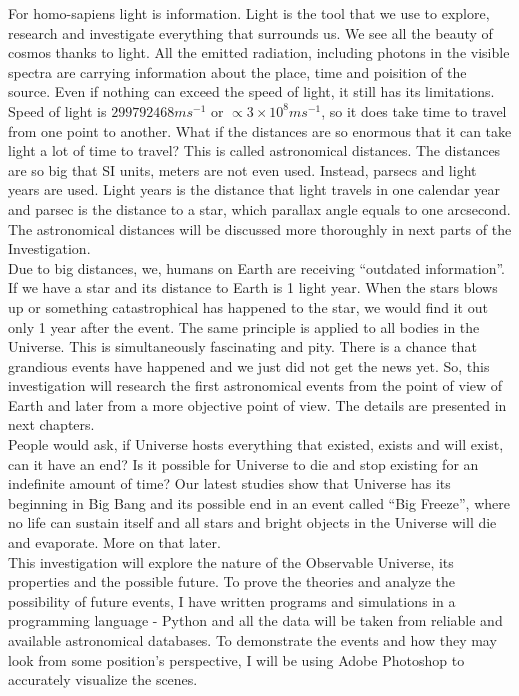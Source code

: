 \documentclass[a4paper]{IEEEtran}
\begin{document}
For homo-sapiens light is information. Light is the tool that we use to explore, research and investigate everything that surrounds us. We see all the beauty of cosmos thanks to light. All the emitted radiation, including photons in the visible spectra are carrying information about the place, time and poisition of the source. Even if nothing can exceed the speed of light, it still has its limitations. Speed of light is $299792468ms^{-1}$ or $\propto 3 \times 10^8ms^{-1}$\cite{speed}, so it does take time to travel from one point to another. What if the distances are so enormous that it can take light a lot of time to travel? This is called astronomical distances. The distances are so big that SI units, meters are not even used. Instead, parsecs and light years are used. Light years is the distance that light travels in one calendar year and parsec is the distance to a star, which parallax angle equals to one arcsecond. The astronomical distances will be discussed more thoroughly in next parts of the Investigation.\\

Due to big distances, we, humans on Earth are receiving ``outdated information''. If we have a star and its distance to Earth is 1 light year. When the stars blows up or something catastrophical has happened to the star, we would find it out only 1 year after the event. The same principle is applied to all bodies in the Universe. This is simultaneously fascinating and pity. There is a chance that grandious events have happened and we just did not get the news yet. So, this investigation will research the first astronomical events from the point of view of Earth and later from a more objective point of view. The details are presented in next chapters.\\

People would ask, if Universe hosts everything that existed, exists and will exist, can it have an end? Is it possible for Universe to die and stop existing for an indefinite amount of time? Our latest studies show that Universe has its beginning in Big Bang and its possible end in an event called ``Big Freeze'', where no life can sustain itself and all stars and bright objects in the Universe will die and evaporate. More on that later.\\

This investigation will explore the nature of the Observable Universe, its properties and the possible future. To prove the theories and analyze the possibility of future events, I have written programs and simulations in a programming language - Python and all the data will be taken from reliable and available astronomical databases. To demonstrate the events and how they may look from some position's perspective, I will be using Adobe Photoshop to accurately visualize the scenes.\\
\end{document}
